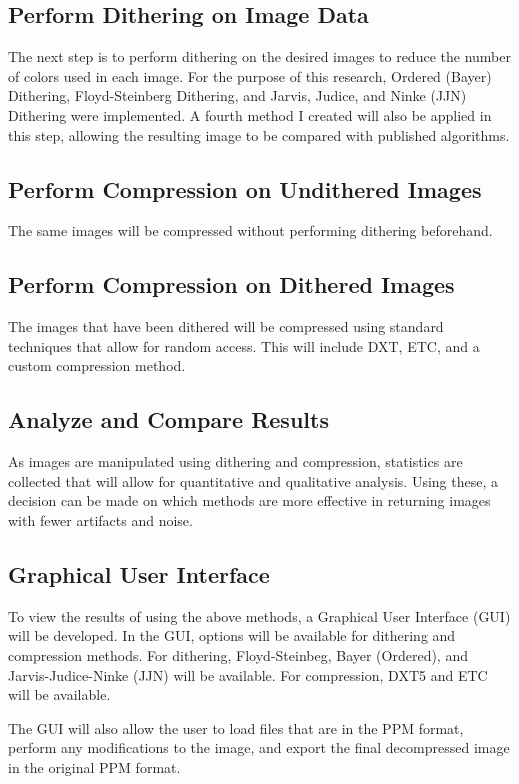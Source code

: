 \documentclass[12pt]{article}
\begin{document}
\subsection{Perform Dithering on Image Data}
The next step is to perform dithering on the desired images to reduce the number of colors used in each image. For the purpose of this research, Ordered (Bayer) Dithering, Floyd-Steinberg Dithering, and Jarvis, Judice, and Ninke  (JJN) Dithering were implemented. A fourth method I created will also be applied in this step, allowing the resulting image to be compared with published algorithms.

\subsection{Perform Compression on Undithered Images}
The same images will be compressed without performing dithering beforehand.

\subsection{Perform Compression on Dithered Images}
The images that have been dithered will be compressed using standard techniques that allow for random access. This will include DXT, ETC, and a custom compression method.

\subsection{Analyze and Compare Results}
As images are manipulated using dithering and compression, statistics are collected that will allow for quantitative and qualitative analysis. Using these, a decision can be made on which methods are more effective in returning images with fewer artifacts and noise.

\subsection{Graphical User Interface}
To view the results of using the above methods, a Graphical User Interface (GUI) will be developed. In the GUI, options will be available for dithering and compression methods. For dithering, Floyd-Steinbeg, Bayer (Ordered), and Jarvis-Judice-Ninke (JJN) will be available. For compression, DXT5 and ETC will be available.

The GUI will also allow the user to load files that are in the PPM format, perform any modifications to the image, and export the final decompressed image in the original PPM format.
\end{document}
